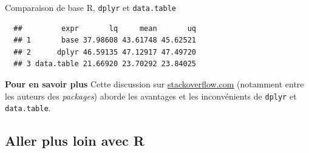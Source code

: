 \documentclass[12pt,handout,ignorenonframetext,]{beamer}
\newenvironment{Shaded}{}{}
\newcommand{\KeywordTok}[1]{\textcolor[rgb]{0.00,0.00,1.00}{{#1}}}
\newcommand{\DataTypeTok}[1]{{#1}}
\newcommand{\StringTok}[1]{\textcolor[rgb]{0.00,0.50,0.50}{{#1}}}
\newcommand{\CommentTok}[1]{\textcolor[rgb]{0.00,0.50,0.00}{{#1}}}
\newcommand{\NormalTok}[1]{{#1}}
\renewenvironment{Shaded}{\begin{snugshade}}{\end{snugshade}}
\begin{document}
\begin{frame}[fragile]{Comparaison de base R, \texttt{dplyr} et
\texttt{data.table}}

\footnotesize

\begin{Shaded}
\end{Shaded}

\vspace{-5mm}

\begin{verbatim}
  ##         expr       lq     mean       uq
  ## 1       base 37.98608 43.61748 45.62521
  ## 2      dplyr 46.59135 47.12917 47.49720
  ## 3 data.table 21.66920 23.70292 23.84025
\end{verbatim}

\normalsize

\textbf{Pour en savoir plus} Cette discussion sur
\href{http://stackoverflow.com/questions/21435339/data-table-vs-dplyr-can-one-do-something-well-the-other-cant-or-does-poorly}{\underline{stackoverflow.com}}
(notamment entre les auteurs des \emph{packages}) aborde les avantages
et les inconvénients de \texttt{dplyr} et \texttt{data.table}.

\end{frame}

\subsection{Aller plus loin avec R}\label{aller-plus-loin-avec-r}
\end{document}
